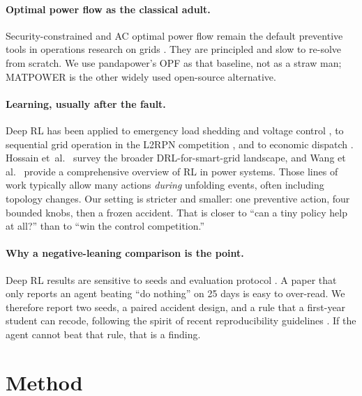 \documentclass[11pt,a4paper]{article}
\begin{document}
\paragraph{Optimal power flow as the classical adult.}
Security-constrained and AC optimal power flow remain the default preventive tools in operations research on grids \citep{capitanescu2016opf,frank2012introduction}.
They are principled and slow to re-solve from scratch.
We use pandapower's OPF \citep{thurner2018pandapower,capitanescu2016opf} as that baseline, not as a straw man; MATPOWER \citep{zimmerman2011matpower} is the other widely used open-source alternative.

\paragraph{Learning, usually after the fault.}
Deep RL has been applied to emergency load shedding and voltage control \citep{huang2020adaptive,duan2020voltage,lan2020ai}, to sequential grid operation in the L2RPN competition \citep{yoon2021l2rpn,marot2021l2rpn}, and to economic dispatch \citep{zhang2020dispatch,glavic2017reinforcement}.
Hossain et~al.~\citep{hossain2021survey} survey the broader DRL-for-smart-grid landscape, and Wang et al.~\citep{wang2020review} provide a comprehensive overview of RL in power systems.
Those lines of work typically allow many actions \emph{during} unfolding events, often including topology changes.
Our setting is stricter and smaller: one preventive action, four bounded knobs, then a frozen accident.
That is closer to ``can a tiny policy help at all?'' than to ``win the control competition.''

\paragraph{Why a negative-leaning comparison is the point.}
Deep RL results are sensitive to seeds and evaluation protocol \citep{henderson2018deep,islam2017reproducibility}.
A paper that only reports an agent beating ``do nothing'' on 25 days is easy to over-read.
We therefore report two seeds, a paired accident design, and a rule that a first-year student can recode, following the spirit of recent reproducibility guidelines \citep{pineau2021checklist}.
If the agent cannot beat that rule, that is a finding.

\section{Method}
\end{document}
